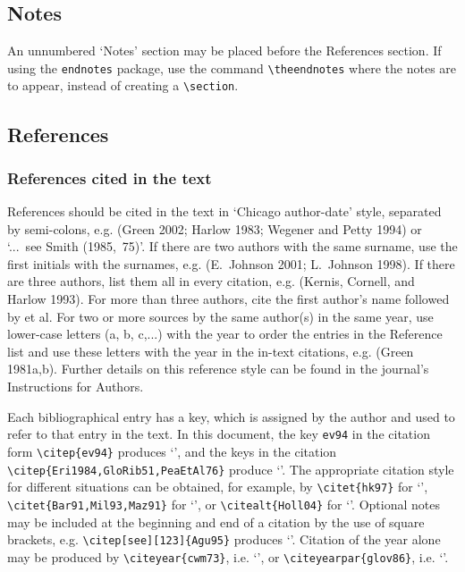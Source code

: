 \documentclass{tPRS2e}
\begin{document}
\subsection{Notes}

An unnumbered `Notes' section may be placed before the References section. If using the \verb"endnotes" package, use the command \verb"\theendnotes" where the notes are to appear, instead of creating a \verb"\section".


\subsection{References}\label{refs}

\subsubsection{References cited in the text}

References should be cited in the text in `Chicago author-date' style, separated by semi-colons, e.g. (Green 2002; Harlow 1983; Wegener and Petty 1994) or `...~see Smith (1985,~75)'. If there are two authors with the same surname, use the first initials with the surnames, e.g. (E.~Johnson 2001; L.~Johnson 1998). If there are three authors, list them all in every citation, e.g. (Kernis, Cornell, and Harlow 1993). For more than three authors, cite the first author's name followed by et al. For two or more sources by the same author(s) in the same year, use lower-case letters (a, b, c,...) with the year to order the entries in the Reference list and use these letters with the year in the in-text citations, e.g. (Green 1981a,b). Further details on this reference style can be found in the journal's Instructions for Authors.

Each bibliographical entry has a key, which is assigned by the author and used to refer to that entry in the text. In this document, the key \verb"ev94" in the citation form \verb"\citep{ev94}" produces `\citep{ev94}', and the keys in the citation \verb"\citep{Eri1984,GloRib51,PeaEtAl76}" produce `\citep{Eri1984,GloRib51,PeaEtAl76}'. The appropriate citation style for different situations can be obtained, for example, by \verb"\citet{hk97}" for `\citet{hk97}', \verb"\citet{Bar91,Mil93,Maz91}" for `\citet{Bar91,Mil93,Maz91}', or \verb"\citealt{Holl04}" for `\citealt{Holl04}'. Optional notes may be included at the beginning and end of a citation by the use of square brackets, e.g. \verb"\citep[see][123]{Agu95}" produces `\citep[see][123]{Agu95}'. Citation of the year alone may be produced by \verb"\citeyear{cwm73}", i.e. `\citeyear{cwm73}', or \verb"\citeyearpar{glov86}", i.e. `\citeyearpar{glov86}'.
\end{document}
